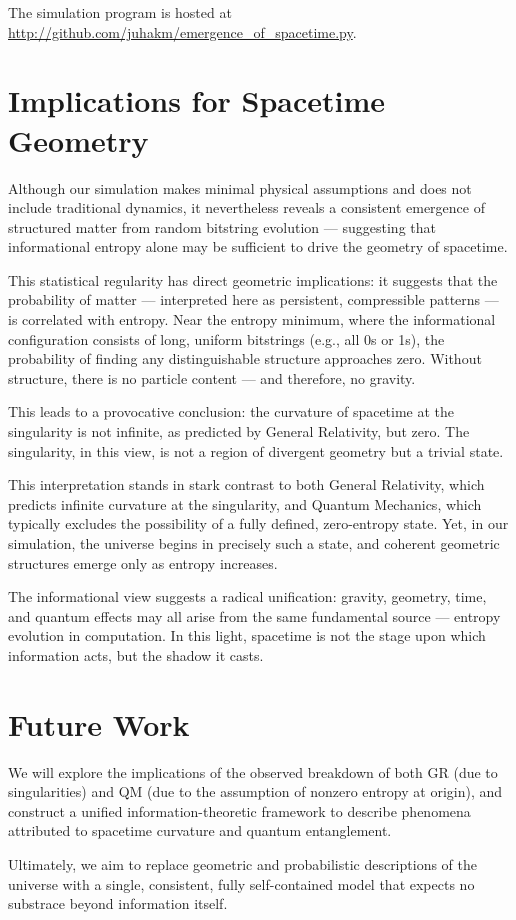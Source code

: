 \documentclass[11pt]{article}
\begin{document}
The simulation program is hosted at \url{http://github.com/juhakm/emergence_of_spacetime.py}.


\section*{Implications for Spacetime Geometry}

Although our simulation makes minimal physical assumptions and does not include traditional dynamics, it nevertheless reveals a consistent emergence of structured matter from random bitstring evolution — suggesting that informational entropy alone may be sufficient to drive the geometry of spacetime.

This statistical regularity has direct geometric implications: it suggests that the probability of matter — interpreted here as persistent, compressible patterns — is correlated with entropy. Near the entropy minimum, where the informational configuration consists of long, uniform bitstrings (e.g., all 0s or 1s), the probability of finding any distinguishable structure approaches zero. Without structure, there is no particle content — and therefore, no gravity.

This leads to a provocative conclusion: the curvature of spacetime at the singularity is not infinite, as predicted by General Relativity, but zero. The singularity, in this view, is not a region of divergent geometry but a trivial state.

This interpretation stands in stark contrast to both General Relativity, which predicts infinite curvature at the singularity, and Quantum Mechanics, which typically excludes the possibility of a fully defined, zero-entropy state. Yet, in our simulation, the universe begins in precisely such a state, and coherent geometric structures emerge only as entropy increases.

The informational view suggests a radical unification: gravity, geometry, time, and quantum effects may all arise from the same fundamental source — entropy evolution in computation. In this light, spacetime is not the stage upon which information acts, but the shadow it casts.


\section{Future Work}

We will explore the implications of the observed breakdown of both GR (due to singularities) and QM (due to the assumption of nonzero entropy at origin), and construct a unified information-theoretic framework to describe phenomena attributed to spacetime curvature and quantum entanglement.

Ultimately, we aim to replace geometric and probabilistic descriptions of the universe with a single, consistent, fully self-contained model that expects no substrace beyond information itself.
\end{document}
